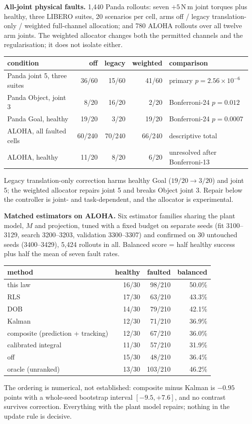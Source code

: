 \documentclass{article}
\begin{document}
\textbf{All-joint physical faults.} 1,440 Panda rollouts: seven $+5$\,N\,m joint torques plus
healthy, three LIBERO suites, 20 scenarios per cell, arms off / legacy translation-only /
weighted full-channel allocation; and 780 ALOHA rollouts over all twelve arm joints. The
weighted allocator changes both the permitted channels and the regularisation; it does not
isolate either.
\begin{center}\small
\begin{tabular}{lrrrl}
\toprule
condition & off & legacy & weighted & comparison \\
\midrule
Panda joint 5, three suites & 36/60 & 15/60 & 41/60 & primary $p=2.56\times10^{-6}$ \\
Panda Object, joint 3 & 8/20 & 16/20 & 2/20 & Bonferroni-24 $p=0.012$ \\
Panda Goal, healthy & 19/20 & 3/20 & 19/20 & Bonferroni-24 $p=0.0007$ \\
ALOHA, all faulted cells & 60/240 & 70/240 & 66/240 & descriptive total \\
ALOHA, healthy & 11/20 & 8/20 & 6/20 & unresolved after Bonferroni-13 \\
\bottomrule
\end{tabular}
\end{center}
Legacy translation-only correction harms healthy Goal ($19/20\to3/20$) and joint 5; the weighted
allocator repairs joint 5 and breaks Object joint 3. Repair below the controller is
joint- and task-dependent, and the allocator is experimental.

\textbf{Matched estimators on ALOHA.} Six estimator families sharing the plant model, $M$ and
projection, tuned with a fixed budget on separate seeds (fit 3100--3129, search 3200--3203,
validation 3300--3307) and confirmed on 30 untouched seeds (3400--3429), 5,424 rollouts in all.
Balanced score = half healthy success plus half the mean of seven fault rates.
\begin{center}\small
\begin{tabular}{lrrr}
\toprule
method & healthy & faulted & balanced \\
\midrule
this law & 16/30 & 98/210 & 50.0\% \\
RLS & 17/30 & 63/210 & 43.3\% \\
DOB & 14/30 & 79/210 & 42.1\% \\
Kalman & 12/30 & 71/210 & 36.9\% \\
composite (prediction + tracking) & 12/30 & 67/210 & 36.0\% \\
calibrated integral & 11/30 & 57/210 & 31.9\% \\
off & 15/30 & 48/210 & 36.4\% \\
oracle (unranked) & 13/30 & 103/210 & 46.2\% \\
\bottomrule
\end{tabular}
\end{center}
The ordering is numerical, not established: composite minus Kalman is $-0.95$ points with a
whole-seed bootstrap interval $[-9.5,+7.6]$, and no contrast survives correction. Everything
with the plant model repairs; nothing in the update rule is decisive.
\end{document}
